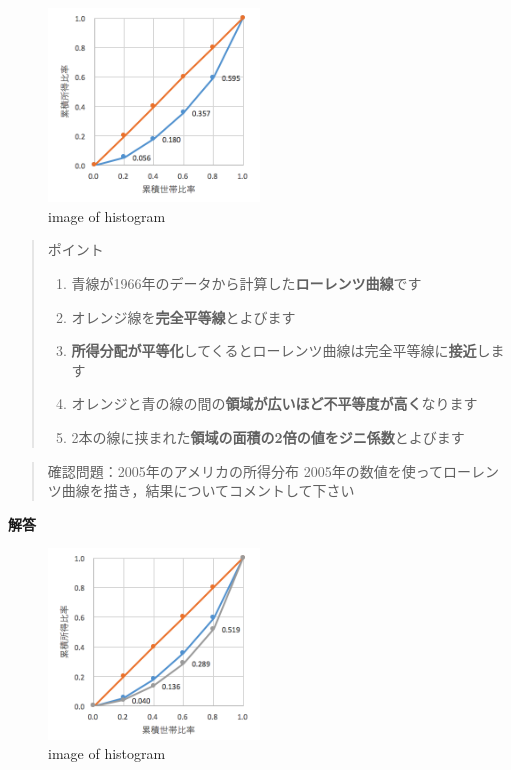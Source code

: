 \documentclass[
]{book}
\providecommand{\tightlist}{%
  \setlength{\itemsep}{0pt}\setlength{\parskip}{0pt}}
\theoremstyle{definition}
\theoremstyle{definition}
\theoremstyle{definition}
\theoremstyle{definition}
\theoremstyle{remark}
\begin{document}
\begin{figure}
\centering
\includegraphics[width=0.5\textwidth,height=\textheight]{images/lec03/fig_us_lorenz1966.png}
\caption{image of histogram}
\end{figure}

\begin{quote}
ポイント

\begin{enumerate}
\def\labelenumi{\arabic{enumi}.}
\tightlist
\item
  青線が1966年のデータから計算した\textbf{ローレンツ曲線}です
\item
  オレンジ線を\textbf{完全平等線}とよびます
\item
  \textbf{所得分配が平等化}してくるとローレンツ曲線は完全平等線に\textbf{接近}します
\item
  オレンジと青の線の間の\textbf{領域が広いほど不平等度が高く}なります
\item
  2本の線に挟まれた\textbf{領域の面積の2倍の値をジニ係数}とよびます
\end{enumerate}
\end{quote}

\begin{quote}
確認問題：2005年のアメリカの所得分布
2005年の数値を使ってローレンツ曲線を描き，結果についてコメントして下さい
\end{quote}

\textbf{解答}

\begin{figure}
\centering
\includegraphics[width=0.5\textwidth,height=\textheight]{images/lec03/fig_us_lorenz2005.png}
\caption{image of histogram}
\end{figure}
\end{document}
